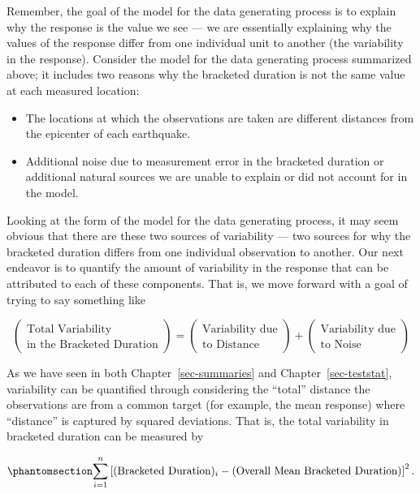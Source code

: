 \documentclass[
  letterpaper,
  DIV=11,
  numbers=noendperiod]{scrreprt}
\providecommand{\tightlist}{%
  \setlength{\itemsep}{0pt}\setlength{\parskip}{0pt}}\usepackage{longtable,booktabs,array}
\theoremstyle{plain}
\theoremstyle{definition}
\theoremstyle{definition}
\theoremstyle{remark}
\begin{document}
Remember, the goal of the model for the data generating process is to
explain why the response is the value we see --- we are essentially
explaining why the values of the response differ from one individual
unit to another (the variability in the response). Consider the model
for the data generating process summarized above; it includes two
reasons why the bracketed duration is not the same value at each
measured location:

\begin{itemize}
\tightlist
\item
  The locations at which the observations are taken are different
  distances from the epicenter of each earthquake.
\item
  Additional noise due to measurement error in the bracketed duration or
  additional natural sources we are unable to explain or did not account
  for in the model.
\end{itemize}

Looking at the form of the model for the data generating process, it may
seem obvious that there are these two sources of variability --- two
sources for why the bracketed duration differs from one individual
observation to another. Our next endeavor is to quantify the amount of
variability in the response that can be attributed to each of these
components. That is, we move forward with a goal of trying to say
something like

\[\begin{pmatrix} \text{Total Variability} \\ \text{in the Bracketed Duration} \end{pmatrix} = \begin{pmatrix} \text{Variability due} \\ \text{to Distance} \end{pmatrix} + \begin{pmatrix} \text{Variability due} \\ \text{to Noise} \end{pmatrix}\]

As we have seen in both Chapter~\ref{sec-summaries} and
Chapter~\ref{sec-teststat}, variability can be quantified through
considering the ``total'' distance the observations are from a common
target (for example, the mean response) where ``distance'' is captured
by squared deviations. That is, the total variability in bracketed
duration can be measured by

\begin{equation}\phantomsection\label{eq-regquality-sst}{\sum_{i=1}^{n} \left[(\text{Bracketed Duration})_i - (\text{Overall Mean Bracketed Duration})\right]^2.}\end{equation}
\end{document}
